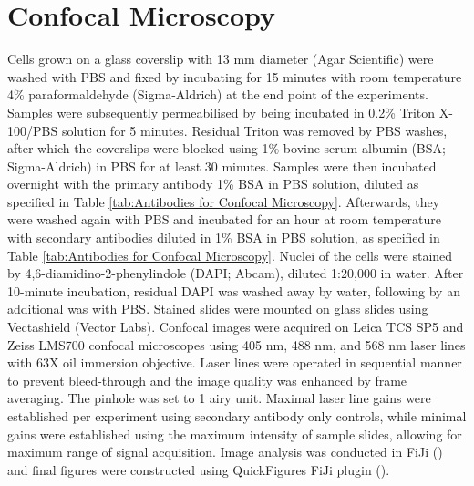 \section{Confocal Microscopy} \label{sec:Confocal Microscopy}
Cells grown on a glass coverslip with 13 mm diameter (Agar Scientific) were washed with PBS and fixed by incubating for 15 minutes with room temperature 4\% paraformaldehyde (Sigma-Aldrich) at the end point of the experiments. Samples were subsequently permeabilised by being incubated in 0.2\% Triton X-100/PBS solution for 5 minutes. Residual Triton was removed by PBS washes, after which the coverslips were blocked using 1\% bovine serum albumin (BSA; Sigma-Aldrich) in PBS for at least 30 minutes. Samples were then incubated overnight with the primary antibody 1\% BSA in PBS solution, diluted as specified in Table \ref{tab:Antibodies for Confocal Microscopy}. Afterwards, they were washed again with PBS and incubated for an hour at room temperature with secondary antibodies diluted in 1\% BSA in PBS solution, as specified in Table \ref{tab:Antibodies for Confocal Microscopy}. Nuclei of the cells were stained by 4,6-diamidino-2-phenylindole (DAPI; Abcam), diluted 1:20,000 in water. After 10-minute incubation, residual DAPI was washed away by water, following by an additional was with PBS. Stained slides were mounted on glass slides using Vectashield (Vector Labs). Confocal images were acquired on Leica TCS SP5 and Zeiss LMS700 confocal microscopes using 405 nm, 488 nm, and 568 nm laser lines with 63X oil immersion objective. Laser lines were operated in sequential manner to prevent bleed-through and the image quality was enhanced by frame averaging. The pinhole was set to 1 airy unit. Maximal laser line gains were established per experiment using secondary antibody only controls, while minimal gains were established using the maximum intensity of sample slides, allowing for maximum range of signal acquisition. Image analysis was conducted in FiJi (\cite{Schindelin2012Fiji:Analysis}) and final figures were constructed using QuickFigures FiJi plugin (\cite{Mazo2021QuickFigures:Figures}).


